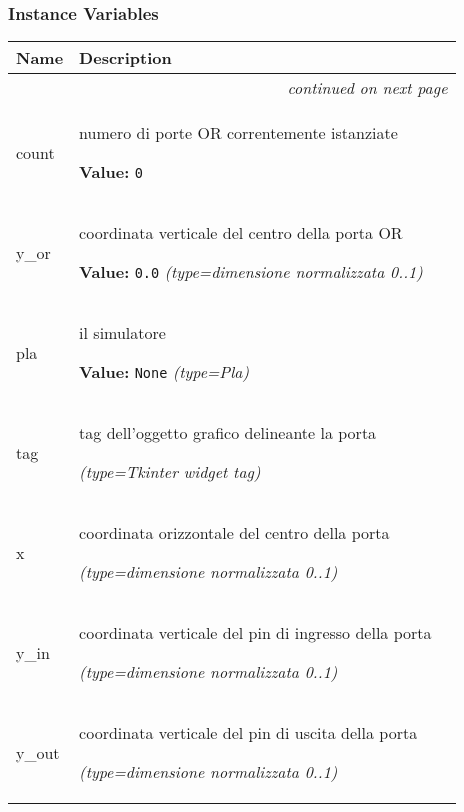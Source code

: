 
  \subsubsection{Instance Variables}

    \vspace{-1cm}
\hspace{\varindent}\begin{longtable}{|p{\varnamewidth}|p{\vardescrwidth}|l}
\cline{1-2}
\cline{1-2} \centering \textbf{Name} & \centering \textbf{Description}& \\
\cline{1-2}
\endhead\cline{1-2}\multicolumn{3}{r}{\small\textit{continued on next page}}\\\endfoot\cline{1-2}
\endlastfoot\raggedright c\-o\-u\-n\-t\- & \raggedright numero di porte OR correntemente istanziate

\textbf{Value:} 
{\tt 0}&\\
\cline{1-2}
\raggedright y\-\_\-o\-r\- & \raggedright coordinata verticale del centro della porta OR

\textbf{Value:} 
{\tt 0.0}            {\it (type=dimensione normalizzata 0..1)}&\\
\cline{1-2}
\raggedright p\-l\-a\- & \raggedright il simulatore

\textbf{Value:} 
{\tt None}            {\it (type=Pla)}&\\
\cline{1-2}
\raggedright t\-a\-g\- & \raggedright tag dell'oggetto grafico delineante la porta

            {\it (type=Tkinter widget tag)}&\\
\cline{1-2}
\raggedright x\- & \raggedright coordinata orizzontale del centro della porta

            {\it (type=dimensione normalizzata 0..1)}&\\
\cline{1-2}
\raggedright y\-\_\-i\-n\- & \raggedright coordinata verticale del pin di ingresso della porta

            {\it (type=dimensione normalizzata 0..1)}&\\
\cline{1-2}
\raggedright y\-\_\-o\-u\-t\- & \raggedright coordinata verticale del pin di uscita della porta

            {\it (type=dimensione normalizzata 0..1)}&\\
\cline{1-2}
\end{longtable}

